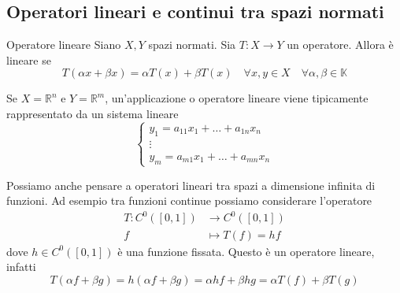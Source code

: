 \subsection{Operatori lineari e continui tra spazi normati}
\begin{definition}{Operatore lineare}
    Siano \(X, Y\) spazi normati. Sia \(T : X \to Y\) un operatore. Allora è
    lineare se 
    \[
      T{(\alpha x + \beta x )} = \alpha T{(x)} + \beta T{(x)} \quad \forall x, y
      \in X \quad \forall \alpha, \beta \in \mathbb{K}
    \]
\end{definition}
\begin{example}
    Se \(X = \mathbb{R}^{n}\) e \(Y = \mathbb{R}^{m}\), un'applicazione o
    operatore lineare viene tipicamente rappresentato da un sistema lineare 
    \begin{equation}\label{eq:sistema_lineare}
        \begin{cases}
            y_1 = a_{11}x_1 + \ldots + a_{1n}x_n \\
            \vdots \\
            y_m = a_{m1}x_1 + \ldots + a_{mn}x_n
        \end{cases}
    \end{equation}
\end{example}
Possiamo anche pensare a operatori lineari tra spazi a dimensione infinita di
funzioni. Ad esempio tra funzioni continue possiamo considerare l'operatore 
  \begin{align*}
      T: C^{0}{([0, 1])} &\longrightarrow C^{0}{([0,1])} \\
      f &\longmapsto T(f) = hf
  \end{align*}
dove \(h \in C^{0}{([0, 1])}\) è una funzione fissata. Questo è un operatore
lineare, infatti
\[
    T{(\alpha f + \beta g)} = h{(\alpha f + \beta g)} = \alpha hf + \beta hg =
    \alpha T{(f)} + \beta T{(g)}
\]


